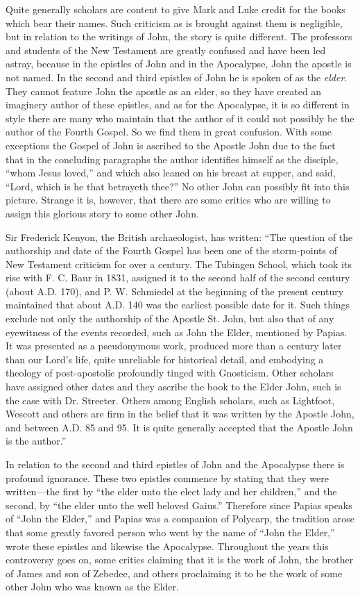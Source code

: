 Quite generally scholars are content to give Mark and Luke credit for the books which bear
their names. Such criticism as is brought against them is negligible, but in relation to the
writings of John, the story is quite different. The professors and students of the New
Testament are greatly confused and have been led astray, because in the epistles of John and
in the Apocalypse, John the apostle is not named. In the second and third epistles of John he
is spoken of as the \textit{elder}. They cannot feature John the apostle as an elder, so they have
created an imaginery author of these epistles, and as for the Apocalypse, it is so different in
style there are many who maintain that the author of it could not possibly be the author of the
Fourth Gospel. So we find them in great confusion. With some exceptions the Gospel of John
is ascribed to the Apostle John due to the fact that in the concluding paragraphs the author
identifies himself as the disciple, ``whom Jesus loved,'' and which also leaned on his breast at
supper, and said, ``Lord, which is he that betrayeth thee?'' No other John can possibly fit into
this picture. Strange it is, however, that there are some critics who are willing to assign this
glorious story to some other John.

Sir Frederick Kenyon, the British archaeologist, has written: ``The question of the authorship
and date of the Fourth Gospel has been one of the storm-points of New Testament criticism
for over a century. The Tubingen School, which took its rise with F. C. Baur in 1831,
assigned it to the second half of the second century (about A.D. 170), and P. W. Schmiedel at
the beginning of the present century maintained that about A.D. 140 was the earliest possible
date for it. Such things exclude not only the authorship of the Apostle St. John, but also that
of any eyewitness of the events recorded, such as John the Elder, mentioned by Papias. It was
presented as a pseudonymous work, produced more than a century later than our Lord's life,
quite unreliable for historical detail, and embodying a theology of post-apostolic profoundly
tinged with Gnosticism. Other scholars have assigned other dates and they ascribe the book
to the Elder John, such is the case with Dr. Streeter. Others among English scholars, such as
Lightfoot, Wescott and others are firm in the belief that it was written by the Apostle John,
and between A.D. 85 and 95. It is quite generally accepted that the Apostle John is the
author.''

In relation to the second and third epistles of John and the Apocalypse there is profound
ignorance. These two epistles commence by stating that they were written—the first by ``the
elder unto the elect lady and her children,'' and the second, by ``the elder unto the well
beloved Gaius.'' Therefore since Papias speaks of ``John the Elder,'' and Papias was a
companion of Polycarp, the tradition arose that some greatly favored person who went by the
name of ``John the Elder,'' wrote these epistles and likewise the Apocalypse. Throughout the
years this controversy goes on, some critics claiming that it is the work of John, the brother
of James and son of Zebedee, and others proclaiming it to be the work of some other John
who was known as the Elder.

